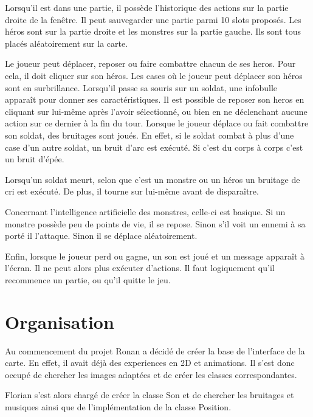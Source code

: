 \documentclass{article}
\begin{document}
Lorsqu'il est dans une partie, il possède l'historique des actions sur la partie droite de la fenêtre. 
Il peut sauvegarder une partie parmi 10 slots proposés. 
Les héros sont sur la partie droite et les monstres sur la partie gauche. Ils sont tous placés aléatoirement sur la carte. 

Le joueur peut déplacer, reposer ou faire combattre chacun de ses heros. 
Pour cela, il doit cliquer sur son héros. 
Les cases où le joueur peut déplacer son héros sont en surbrillance.
Lorsqu'il passe sa souris sur un soldat, une infobulle apparaît pour donner ses caractéristiques.
Il est possible de reposer son heros en cliquant sur lui-même après l'avoir sélectionné, ou bien en ne déclenchant aucune action sur ce dernier à la fin du tour.
Lorsque le joueur déplace ou fait combattre son soldat, des bruitages sont joués. 
En effet, si le soldat combat à plus d'une case d'un autre soldat, un bruit d'arc est exécuté. 
Si c'est du corps à corps c'est un bruit d'épée.

Lorsqu'un soldat meurt, selon que c'est un monstre ou un héros un bruitage de cri est exécuté. 
De plus, il tourne sur lui-même avant de disparaître.

Concernant l'intelligence artificielle des monstres, celle-ci est basique. 
Si un monstre possède peu de points de vie, il se repose.
Sinon s'il voit un ennemi à sa porté il l'attaque. 
Sinon il se déplace aléatoirement.

Enfin, lorsque le joueur perd ou gagne, un son est joué et un message apparaît à l'écran. Il ne peut alors plus exécuter d'actions.
Il faut logiquement qu'il recommence un partie, ou qu'il quitte le jeu.

\section{Organisation}
Au commencement du projet Ronan a décidé de créer la base de l'interface de la carte. 
En effet, il avait déjà des experiences en 2D et animations. 
Il s'est donc occupé de chercher les images adaptées et de créer les classes correspondantes.

Florian s'est alors chargé de créer la classe Son et de chercher les bruitages et musiques ainsi que de l'implémentation de la classe Position.
\end{document}
